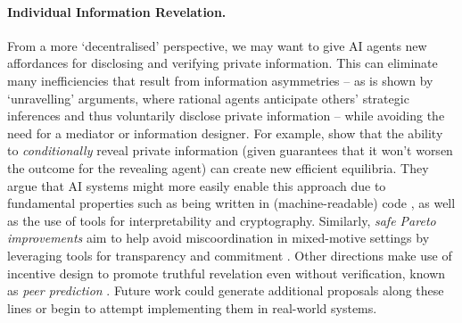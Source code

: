 \paragraph{Individual Information Revelation.}
From a more `decentralised' perspective, we may want to give AI agents new affordances for disclosing and verifying private information.
This can eliminate many inefficiencies that result from information asymmetries -- as is shown by `unravelling' arguments, where rational agents anticipate others' strategic inferences and thus voluntarily disclose private information \citep{Grossman1981-lx,milgrom1981good} -- while avoiding the need for a mediator or information designer.
For example, \citet{digiovanni2023commitment} show that the ability to \textit{conditionally} reveal private information (given guarantees that it won't worsen the outcome for the revealing agent) can create new efficient equilibria.
They argue that AI systems might more easily enable this 
approach due to fundamental properties such as being 
written in (machine-readable) code \citep{McAfee1984,Howard1988,tennenholtz2004program,halpern2018game,Oesterheld2018}, 
as well as the use of tools for interpretability and cryptography.
Similarly, \textit{safe Pareto improvements} aim to help avoid miscoordination in mixed-motive settings by leveraging tools for transparency and commitment \citep{oesterheld2022safe,digiovanni2024safe}.
Other directions make use of incentive design to promote truthful revelation even without verification, known as \textit{peer prediction} \citep{Witkowski2012,Kong2019,Prelec2004,Miller2005,Shnayder2016}.
Future work could generate additional proposals along these lines or begin to attempt implementing them in real-world systems.

